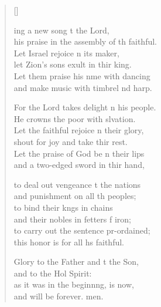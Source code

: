 \settowidth{\versewidth}{his praise in the assembly of the faithful.}
\begin{verse}[\versewidth]
  \begin{patverse}
    ing a new song t the Lord,\Med\\
his praise in the assembly of th faithful.\\
Let Israel rejoice \pointup{\i}n its maker,\Med\\
let Zion’s sons exult in thir king.\\
Let them praise his nme with dancing\Med\\
and make music with timbrel nd harp.

For the Lord takes delight \pointup{\i}n his people.\Med\\
He crowns the poor with slvation.\\
Let the faithful rejoice \pointup{\i}n their glory,\Med\\
shout for joy and take thir rest.\\
Let the praise of God be n their lips\Med\\
and a two-edged sword in thir hand,

to deal out vengeance t the nations\Med\\
and punishment on all th peoples;\\
to bind their k\pointup{\i}ngs in chains\Med\\
and their nobles in fetters f iron;\\
to carry out the sentence pr-ordained;\Med\\
this honor is for all h\pointup{\i}s faithful.

Glory to the Father and t the Son,\Med\\
and to the Hol Spirit:\\
as it was in the beginn\pointup{\i}ng, is now,\Med\\
and will be forever. men.
  \end{patverse}
\end{verse}
